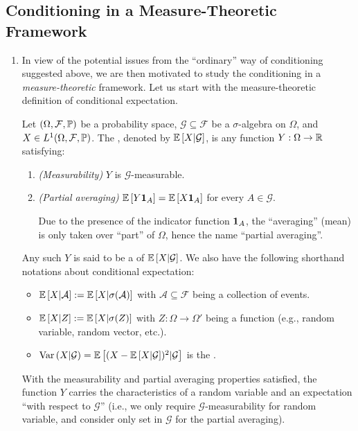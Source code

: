 \subsection{Conditioning in a Measure-Theoretic Framework}
\label{subsect:meas-theoretic-cond}
\begin{enumerate}
\item In view of the potential issues from the ``ordinary'' way of conditioning
suggested above, we are then motivated to study the conditioning in a
\emph{measure-theoretic} framework. Let us start with the measure-theoretic
definition of conditional expectation.

Let \((\Omega,\mathcal{F},\mathbb{P})\) be a probability space, \(\mathcal{G}\subseteq
\mathcal{F}\) be a \(\sigma\)-algebra on \(\Omega\), and \(X\in
L^{1}(\Omega,\mathcal{F},\mathbb{P})\). The , denoted by \(\mathbb{E}\left[X|\mathcal{G}\right]\), is any function
\(Y:\Omega\to\mathbb{R}\) satisfying:
\begin{enumerate}[label={(\arabic*)}]
\item \emph{(Measurability)} \(Y\) is \(\mathcal{G}\)-measurable.
\item \emph{(Partial averaging)} \(\mathbb{E}\left[Y\mathbf{1}_{A}\right]=\mathbb{E}\left[X\mathbf{1}_{A}\right]\) for
every \(A\in\mathcal{G}\).

\begin{note}
Due to the presence of the indicator function \(\mathbf{1}_{A}\), the ``averaging''
(mean) is only taken over ``part'' of \(\Omega\), hence the name ``partial
averaging''.
\end{note}
\end{enumerate}
Any such \(Y\) is said to be a  of \(\mathbb{E}\left[X|\mathcal{G}\right]\). We
also have the following shorthand notations about conditional expectation:
\begin{itemize}
\item \(\mathbb{E}\left[X|\mathcal{A}\right]:=\mathbb{E}\left[X|\sigma(\mathcal{A})\right]\) with
\(\mathcal{A}\subseteq \mathcal{F}\) being a collection of events.
\item \(\mathbb{E}\left[X|Z\right]:=\mathbb{E}\left[X|\sigma(Z)\right]\) with \(Z:\Omega\to\Omega'\) being a
function (e.g., random variable, random vector, etc.).
\item \(\operatorname{Var}\left(X|\mathcal{G}\right)=\mathbb{E}\left[(X-\mathbb{E}\left[X|\mathcal{G}\right])^{2}|\mathcal{G}\right]\)
is the .
\end{itemize}
With the measurability and partial averaging properties satisfied, the function
\(Y\) carries the characteristics of a random variable and an expectation
``with respect to \(\mathcal{G}\)'' (i.e., we only require
\(\mathcal{G}\)-measurability for random variable, and consider only set in
\(\mathcal{G}\) for the partial averaging).


\end{enumerate}
